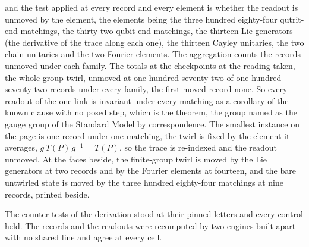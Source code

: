 \begin{chproof}
and the test applied at every record and every element is whether the readout is unmoved by the element, the elements being the three hundred eighty-four qutrit-end matchings, the thirty-two qubit-end matchings, the thirteen Lie generators (the derivative of the trace along each one), the thirteen Cayley unitaries, the two chain unitaries and the two Fourier elements. The aggregation counts the records unmoved under each family. The totals at the checkpoints at the reading taken, the whole-group twirl, unmoved at one hundred seventy-two of one hundred seventy-two records under every family, the first moved record none. So every readout of the one link is invariant under every matching as a corollary of the known clause with no posed step, which is the theorem, the group named as the gauge group of the Standard Model by correspondence. The smallest instance on the page is one record under one matching, the twirl is fixed by the element it averages, $g\,T(P)\,g^{-1} = T(P)$, so the trace is re-indexed and the readout unmoved. At the faces beside, the finite-group twirl is moved by the Lie generators at two records and by the Fourier elements at fourteen, and the bare untwirled state is moved by the three hundred eighty-four matchings at nine records, printed beside.

The counter-tests of the derivation stood at their pinned letters and every control held. The records and the readouts were recomputed by two engines built apart with no shared line and agree at every cell.
\end{chproof}
\par\medskip{}\label{narr:close:4-1}\par
